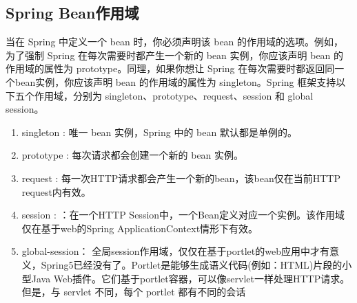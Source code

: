 \documentclass[../../../interview-questions.tex]{subfiles}
\begin{document}
\subsection{Spring Bean作用域}

当在 Spring 中定义一个 bean 时，你必须声明该 bean 的作用域的选项。例如，为了强制 Spring 在每次需要时都产生一个新的 bean 实例，你应该声明 bean 的作用域的属性为 prototype。同理，如果你想让 Spring 在每次需要时都返回同一个bean实例，你应该声明 bean 的作用域的属性为 singleton。Spring 框架支持以下五个作用域，分别为 singleton、prototype、request、session 和 global session。

\begin{enumerate}
    \item {singleton : 唯一 bean 实例，Spring 中的 bean 默认都是单例的。}
    \item {prototype : 每次请求都会创建一个新的 bean 实例。}
    \item {request : 每一次HTTP请求都会产生一个新的bean，该bean仅在当前HTTP request内有效。}
    \item {session : ：在一个HTTP Session中，一个Bean定义对应一个实例。该作用域仅在基于web的Spring ApplicationContext情形下有效。}
    \item {global-session： 全局session作用域，仅仅在基于portlet的web应用中才有意义，Spring5已经没有了。Portlet是能够生成语义代码(例如：HTML)片段的小型Java Web插件。它们基于portlet容器，可以像servlet一样处理HTTP请求。但是，与 servlet 不同，每个 portlet 都有不同的会话}
\end{enumerate}
\end{document}
